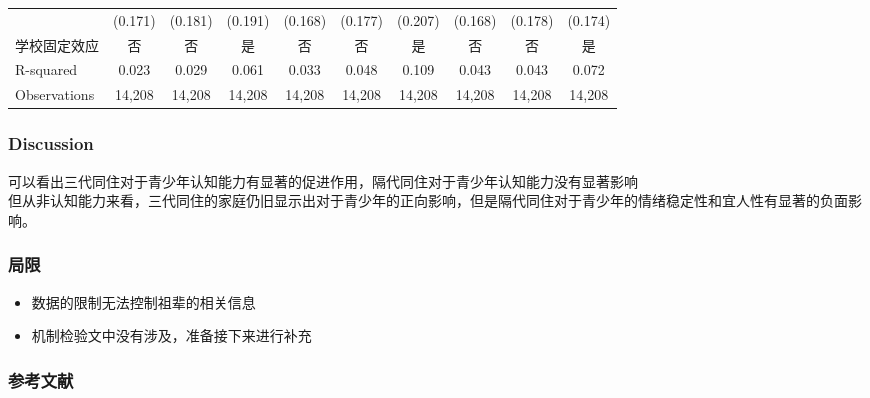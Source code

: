 \documentclass{beamer}
\begin{document}
\begin{frame}
\begin{table}[htbp]
{\begin{tabular}{lccccccccc}
             & (0.171)    & (0.181)    & (0.191)    & (0.168)    & (0.177)    & (0.207)   & (0.168)    & (0.178)    & (0.174)   \\
学校固定效应  & 否    	& 否     	& 是 			& 否    	 	& 否     	 & 是    		& 否    		& 否     	& 是  \\
R-squared    & 0.023      & 0.029      & 0.061      & 0.033      & 0.048      & 0.109     & 0.043      & 0.043      & 0.072    \\
Observations & 14,208     & 14,208     & 14,208     & 14,208     & 14,208     & 14,208    & 14,208     & 14,208     & 14,208    \\
\hline
\end{tabular}} %
\end{table}	
\end{frame}



\begin{frame}
	\frametitle{Discussion}
	可以看出三代同住对于青少年认知能力有显著的促进作用，隔代同住对于青少年认知能力没有显著影响
\\ 但从非认知能力来看，三代同住的家庭仍旧显示出对于青少年的正向影响，但是隔代同住对于青少年的情绪稳定性和宜人性有显著的负面影响。
\end{frame}

\begin{frame}
	\frametitle{局限}
	\begin{itemize}
		\item 数据的限制无法控制祖辈的相关信息
		\item 机制检验文中没有涉及，准备接下来进行补充

	\end{itemize}
\end{frame}


\begin{frame}
    \frametitle{参考文献}
\tiny


\end{frame}
\end{document}
